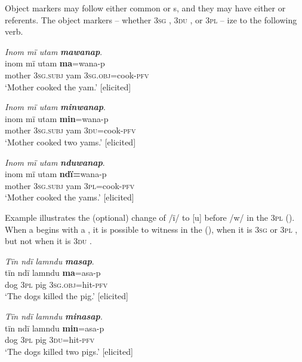 Object markers may follow either  common or s, and they may have either  or  referents. The object markers -- whether 3\textsc{sg} , 3\textsc{du} , or 3\textsc{pl}  -- ize to the following verb.

\ea%
    \label{ex:det:31}
          \textit{Inom mï utam} \textbf{\textit{mawanap}}.\\
\gll inom  mï      utam  \textbf{ma}=wana-p\\
    mother  3\textsc{sg.subj}  yam  3\textsc{sg.obj}=cook-\textsc{pfv}\\
\glt `Mother cooked the yam.’ [elicited]
\z

\ea%
    \label{ex:det:32}
          \textit{Inom mï utam} \textbf{\textit{minwanap}}.\\
\gll inom  mï      utam  \textbf{min}=wana-p\\
    mother  3\textsc{sg.subj}  yam  3\textsc{du}=cook-\textsc{pfv}\\
\glt `Mother cooked two yams.’ [elicited]
\z

\ea%
    \label{ex:det:33}
         \textit{Inom mï utam} \textbf{\textit{nduwanap}}.\\
\gll inom  mï      utam  \textbf{ndï=}wana-p\\
    mother  3\textsc{sg.subj}  yam  3\textsc{pl}=cook-\textsc{pfv}\\
\glt `Mother cooked the yams.’ [elicited]
\z

Example  illustrates the (optional) change of /ï/ to [u] before /w/ in the 3\textsc{pl}  (). When a  begins with a , it is possible to witness    in the  (), when it is \textsc{3sg}  or 3\textsc{pl} , but not when it is \textsc{3du} .

\ea%
    \label{ex:det:34}
          \textit{Tïn ndï lamndu} \textbf{\textit{masap}}.\\
\gll tïn    ndï  lamndu  \textbf{ma}=asa-p\\
    dog  3\textsc{pl}  pig      3\textsc{sg.obj}=hit-\textsc{pfv}\\
\glt `The dogs killed the pig.’ [elicited]
\z

\ea%
    \label{ex:det:35}
          \textit{Tïn ndï lamndu} \textbf{\textit{minasap}}.\\
\gll tïn    ndï  lamndu  \textbf{min}=asa-p\\
    dog  3\textsc{pl}  pig      3\textsc{du}=hit-\textsc{pfv}\\
\glt `The dogs killed two pigs.’ [elicited]
\z

